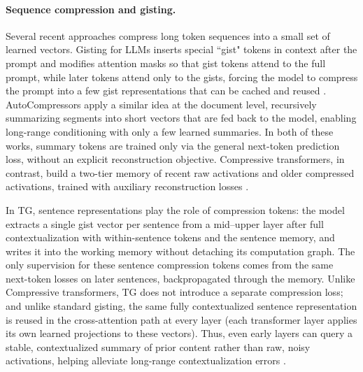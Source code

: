\documentclass{article}
\begin{document}
\paragraph{Sequence compression and gisting.}

Several recent approaches compress long token sequences into a small set of learned vectors.
Gisting for LLMs inserts special “gist" tokens in context after the prompt and modifies attention masks so that gist tokens attend to the full prompt, while later tokens attend only to the gists, forcing the model to compress the prompt into a few gist representations that can be cached and reused \citep{mu2023gisting}.
AutoCompressors \citep{chevalier2023autocompressors} apply a similar idea at the document level, recursively summarizing segments into short vectors that are fed back to the model, enabling long-range conditioning with only a few learned summaries.
In both of these works, summary tokens are trained only via the general next-token prediction loss, without an explicit reconstruction objective.
Compressive transformers, in contrast, build a two-tier memory of recent raw activations and older compressed activations, trained with auxiliary reconstruction losses \citep{rae2019compressivetransformer}.



In TG, sentence representations play the role of compression tokens: the model extracts a single gist vector per sentence from a mid–upper layer after full contextualization with within-sentence tokens and the sentence memory, and writes it into the working memory without detaching its computation graph. The only supervision for these sentence compression tokens comes from the same next-token losses on later sentences, backpropagated through the memory.
Unlike Compressive transformers, TG does not introduce a separate compression loss; and unlike standard gisting, the same fully contextualized sentence representation is reused in the cross-attention path at every layer (each transformer layer applies its own learned projections to these vectors).
Thus, even early layers can query a stable, contextualized summary of prior content rather than raw, noisy activations, helping alleviate long-range contextualization errors \citep{lepori2024racingthoughts}.
\end{document}
